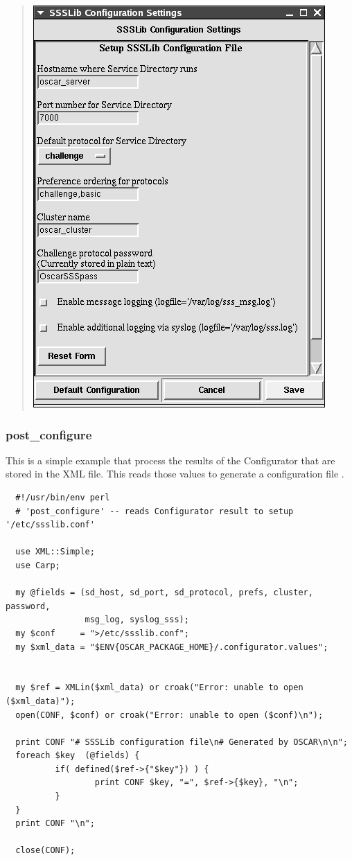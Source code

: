 \begin{quote}
\includegraphics[scale=0.3]{figs/ConfiguratorExample}
\end{quote}



\subsubsection{post\_configure}

This is a simple  example that process the results
of the Configurator that are stored in the XML 
file.  This reads those values to generate a configuration file
.

\begin{scriptsize}
\begin{verbatim}
  #!/usr/bin/env perl
  # 'post_configure' -- reads Configurator result to setup '/etc/ssslib.conf'

  use XML::Simple;
  use Carp;

  my @fields = (sd_host, sd_port, sd_protocol, prefs, cluster, password, 
                msg_log, syslog_sss);
  my $conf     = ">/etc/ssslib.conf";
  my $xml_data = "$ENV{OSCAR_PACKAGE_HOME}/.configurator.values";


  my $ref = XMLin($xml_data) or croak("Error: unable to open ($xml_data)");
  open(CONF, $conf) or croak("Error: unable to open ($conf)\n");

  print CONF "# SSSLib configuration file\n# Generated by OSCAR\n\n";
  foreach $key  (@fields) {
          if( defined($ref->{"$key"}) ) {
                  print CONF $key, "=", $ref->{$key}, "\n";
          }
  }
  print CONF "\n";

  close(CONF);
\end{verbatim}
\end{scriptsize}

